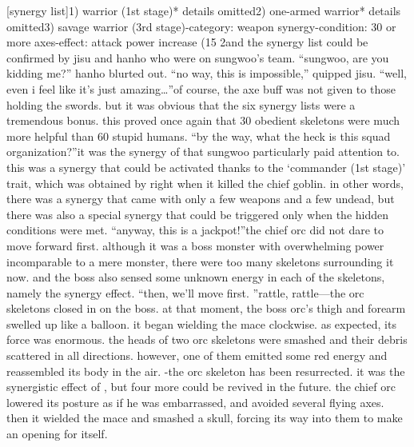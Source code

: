 [synergy list]1) warrior (1st stage)* details omitted2) one-armed warrior* details omitted3) savage warrior (3rd stage)-category: weapon synergy-condition: 30 or more axes-effect: attack power increase (15%
2and the synergy list could be confirmed by jisu and hanho who were on sungwoo’s team.
“sungwoo, are you kidding me?” hanho blurted out.
“no way, this is impossible,” quipped jisu.
“well, even i feel like it’s just amazing…”of course, the axe buff was not given to those holding the swords.
 but it was obvious that the six synergy lists were a tremendous bonus.
this proved once again that 30 obedient skeletons were much more helpful than 60 stupid humans.
“by the way, what the heck is this squad organization?”it was the synergy of  that sungwoo particularly paid attention to.
 this was a synergy that could be activated thanks to the ‘commander (1st stage)’ trait, which was obtained by right when it killed the chief goblin.
in other words, there was a synergy that came with only a few weapons and a few undead, but there was also a special synergy that could be triggered only when the hidden conditions were met.
“anyway, this is a jackpot!”the chief orc did not dare to move forward first.
 although it was a boss monster with overwhelming power incomparable to a mere monster, there were too many skeletons surrounding it now.
and the boss also sensed some unknown energy in each of the skeletons, namely the synergy effect.
“then, we’ll move first.
”rattle, rattle—the orc skeletons closed in on the boss.
 at that moment, the boss orc’s thigh and forearm swelled up like a balloon.
 it began wielding the mace clockwise.
as expected, its force was enormous.
 the heads of two orc skeletons were smashed and their debris scattered in all directions.
 however, one of them emitted some red energy and reassembled its body in the air.
-the orc skeleton has been resurrected.
it was the synergistic effect of , but four more could be revived in the future.
the chief orc lowered its posture as if he was embarrassed, and avoided several flying axes.
 then it wielded the mace and smashed a skull, forcing its way into them to make an opening for itself.


